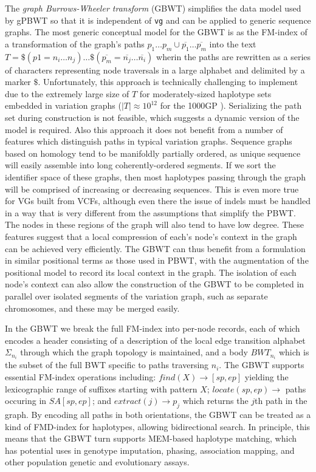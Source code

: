 The \emph{graph Burrows-Wheeler transform} (GBWT) \cite{siren2018haplotype} simplifies the data model used by gPBWT so that it is independent of {\tt vg} and can be applied to generic sequence graphs.
The most generic conceptual model for the GBWT is as the FM-index of a transformation of the graph's paths $p_1\ldots p_m \cup \overline{p_1}\ldots \overline{p_m}$ into the text $T = \$( p1 = n_i\ldots n_j) \ldots \$ (\overline{p_m} = \overline{n_j} \ldots \overline{n_i}) $ wherin the paths are rewritten as a series of characters representing node traversals in a large alphabet and delimited by a marker $\$$.
Unfortunately, this approach is technically challenging to implement due to the extremely large size of $T$ for moderately-sized haplotype sets embedded in variation graphs ($|T| \approx 10^{12}$ for the 1000GP  \cite{siren2018haplotype}).
Serializing the path set during construction is not feasible, which suggests a dynamic version of the model is required.
Also this approach it does not benefit from a number of features which distinguish paths in typical variation graphs.
Sequence graphs based on homology tend to be manifoldly partially ordered, as unique sequence will easily assemble into long coherently-ordered segments.
If we sort the identifier space of these graphs, then most haplotypes passing through the graph will be comprised of increasing or decreasing sequences.
This is even more true for VGs built from VCFs, although even there the issue of indels must be handled in a way that is very different from the assumptions that simplify the PBWT.
The nodes in these regions of the graph will also tend to have low degree.
These features suggest that a local compression of each's node's context in the graph can be achieved very efficiently.
The GBWT can thus benefit from a formulation in similar positional terms as those used in PBWT, with the augmentation of the positional model to record its local context in the graph.
The isolation of each node's context can also allow the construction of the GBWT to be completed in parallel over isolated segments of the variation graph, such as separate chromosomes, and these may be merged easily.

In the GBWT we break the full FM-index into per-node records, each of which encodes a header consisting of a description of the local edge transition alphabet $\Sigma_{n_i}$ through which the graph topology is maintained, and a body $BWT_{n_i}$ which is the subset of the full BWT specific to paths traversing $n_i$.
The GBWT supports essential FM-index operations including: $find(X) \to [sp, ep]$ yielding the lexicographic range of suffixes starting with pattern $X$; $locate(sp, ep) \to$ paths occuring in $SA[sp, ep]$; and $extract(j) \to p_j$ which returns the $j$th path in the graph.
By encoding all paths in both orientations, the GBWT can be treated as a kind of FMD-index for haplotypes, allowing bidirectional search.
In principle, this means that the GBWT turn supports MEM-based haplotype matching, which has potential uses in genotype imputation, phasing, association mapping, and other population genetic and evolutionary assays.

